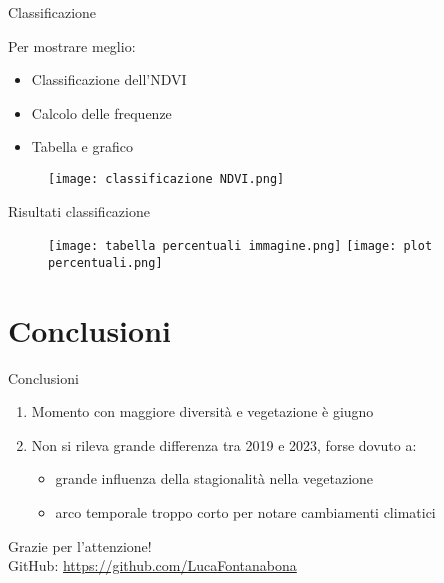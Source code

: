 \documentclass{beamer} %
\begin{document}
\begin{frame}{Classificazione}
\begin{multicols}{2}
Per mostrare meglio: 
    \begin{itemize}
        \item Classificazione dell'NDVI
        \item Calcolo delle frequenze
        \item Tabella e grafico 
    \end{itemize}
    
\columnbreak

\begin{figure}
    \centering
    \texttt{[image: classificazione NDVI.png]}
    \label{fig:enter-label}
\end{figure}

\end{multicols}
\end{frame}

\begin{frame}{Risultati classificazione}
\begin{figure}
    \centering
    \texttt{[image: tabella percentuali immagine.png]}
    \texttt{[image: plot percentuali.png]}        
    \label{fig:enter-label}
\end{figure}
\end{frame}



\section{Conclusioni}

\begin{frame}{Conclusioni}
    \begin{enumerate}
        \item Momento con maggiore diversità e vegetazione è giugno 
        \item \pause Non si rileva grande differenza tra 2019 e 2023, forse dovuto a: \\
        \begin{itemize}
            \item \pause grande influenza della stagionalità nella vegetazione 
            \item \pause arco temporale troppo corto per notare cambiamenti climatici
        \end{itemize}
    \end{enumerate}
\end{frame}

\begin{frame}{}
    \centering
        {\Huge Grazie per l'attenzione!} \\
        \bigskip
        \bigskip
    GitHub: \url{https://github.com/LucaFontanabona}
    
\end{frame}
\end{document}
